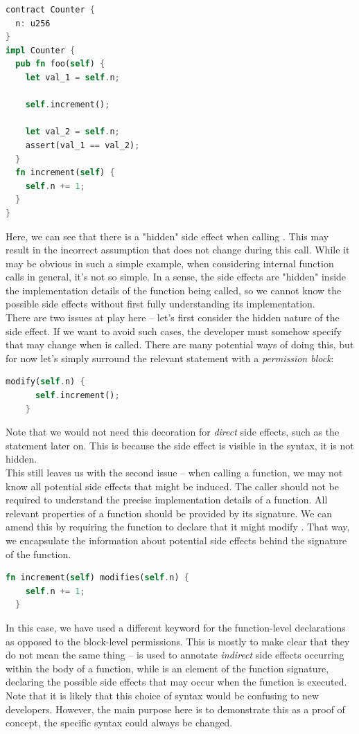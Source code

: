 \begin{lstlisting}[language=Rust, style=boxed]
contract Counter {
  n: u256
}
impl Counter {
  pub fn foo(self) {
    let val_1 = self.n;

    self.increment();

    let val_2 = self.n;
    assert(val_1 == val_2);
  }
  fn increment(self) {
    self.n += 1;
  }
}
\end{lstlisting}
Here, we can see that there is a "hidden" side effect when calling . This may result in the incorrect assumption that  does not change during this call. While it may be obvious in such a simple example, when considering internal function calls in general, it's not so simple. In a sense, the side effects are "hidden" inside the implementation details of the function being called, so we cannot know the possible side effects without first fully understanding its implementation. \\
There are two issues at play here -- let's first consider the hidden nature of the side effect. If we want to avoid such cases, the developer must somehow specify that  may change when  is called. There are many potential ways of doing this, but for now let's simply surround the relevant statement with a \textit{permission block}:
\begin{lstlisting}[language=Rust, style=boxed, firstnumber = 7]
    modify(self.n) {
      self.increment();
    }
\end{lstlisting}
Note that we would not need this decoration for \textit{direct} side effects, such as the  statement later on. This is because the side effect is visible in the syntax, it is not hidden. \\
This still leaves us with the second issue -- when calling a function, we may not know all potential side effects that might be induced. The caller should not be required to understand the precise implementation details of a function. All relevant properties of a function should be provided by its signature. We can amend this by requiring the  function to declare that it might modify . That way, we encapsulate the information about potential side effects behind the signature of the function.
\begin{lstlisting}[language=Rust, style=boxed, firstnumber = 13]
  fn increment(self) modifies(self.n) {
    self.n += 1;
  }
\end{lstlisting}
In this case, we have used a different keyword for the function-level declarations as opposed to the block-level permissions. This is mostly to make clear that they do not mean the same thing --  is used to annotate \textit{indirect} side effects occurring within the body of a function, while  is an element of the function signature, declaring the possible side effects that may occur when the function is executed. Note that it is likely that this choice of syntax would be confusing to new developers. However, the main purpose here is to demonstrate this as a proof of concept, the specific syntax could always be changed. \\

